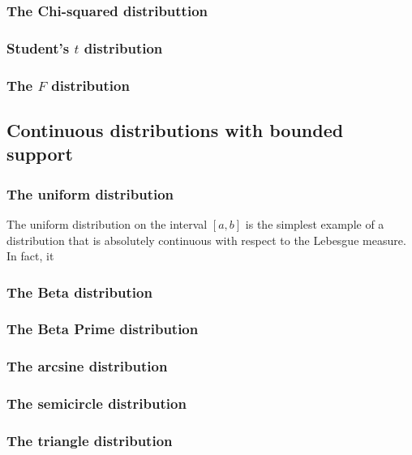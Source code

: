 \subsubsection{The Chi-squared distributtion}

\subsubsection{Student's $t$ distribution}

\subsubsection{The $F$ distribution}

\subsection{Continuous distributions with bounded support}

\subsubsection{The uniform distribution\label{subsec:uniformDistribution}}

The uniform distribution on the interval $\left[a,b\right]$ is the
simplest example of a distribution that is absolutely continuous with
respect to the Lebesgue measure. In fact, it

\subsubsection{The Beta distribution}

\subsubsection{The Beta Prime distribution}

\subsubsection{The arcsine distribution}

\subsubsection{The semicircle distribution}

\subsubsection{The triangle distribution}

